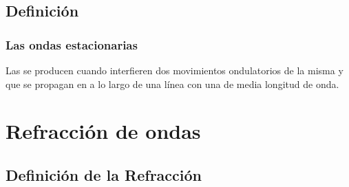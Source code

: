 \documentclass[14pt]{beamer}
\begin{document}
\subsection{Definición}

\begin{frame}
\frametitle{Las ondas estacionarias}
Las  se producen cuando interfieren dos movimientos ondulatorios de la misma  y  \pause que se propagan en  a lo largo de una línea \pause con una  de media longitud de onda.
\end{frame}

\section{Refracción de ondas}
\subsection{Definición de la Refracción}
\end{document}
